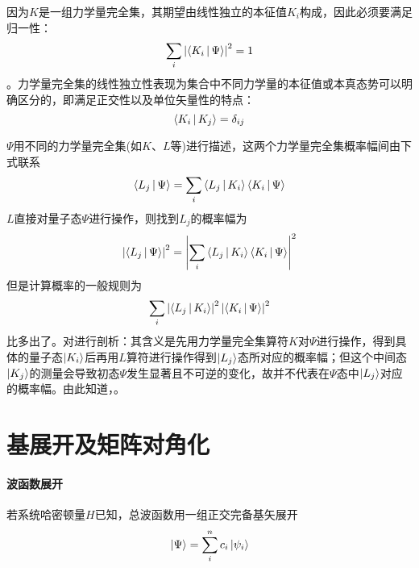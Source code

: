 因为$K$是一组力学量完全集，其期望由线性独立的本征值$K_i$构成，因此必须要满足归一性：
\begin{equation}
    \sum_{i} \left|\Braket{K_i | \Psi}\right|^2 = 1
\end{equation}
。力学量完全集的线性独立性表现为集合中不同力学量的本征值或本真态势可以明确区分的，即满足正交性以及单位矢量性的特点：
\begin{equation}
    \Braket{K_i | K_j} = \delta_{ij}
\end{equation}

$\Psi$用不同的力学量完全集(如$K$、$L$等)进行描述，这两个力学量完全集概率幅间由下式联系
\begin{equation}
    \Braket{L_j | \Psi} = \sum_{i}\Braket{L_j | K_i}\Braket{K_i | \Psi}
\end{equation}
$L$直接对量子态$\Psi$进行操作，则找到$L_j$的概率幅为
\begin{equation}
    \left| \Braket{L_j | \Psi} \right|^2 = \left| \sum_{i}\Braket{L_j | K_i}\Braket{K_i | \Psi} \right|^2
    \label{eq:lj-in-psi}
\end{equation}
但是计算概率的一般规则为
\begin{equation}
    \sum_{i} \left|\Braket{L_j | K_i}\right|^2 \left| \Braket{K_i | \Psi} \right|^2
    \label{eq:conv-cal-prob}
\end{equation}
比多出了。对进行剖析：其含义是先用力学量完全集算符$K$对$\Psi$进行操作，得到具体的量子态$\ket{K_i}$后再用$L$算符进行操作得到$\ket{L_j}$态所对应的概率幅；但这个中间态$\ket{K_j}$的测量会导致初态$\Psi$发生显著且不可逆的变化，故并不代表在$\Psi$态中$\ket{L_j}$对应的概率幅。由此知道，。

\section{基展开及矩阵对角化} \label{sec:mat-diag}
\paragraph*{波函数展开}
若系统哈密顿量$H$已知，总波函数用一组正交完备基矢展开
\begin{equation}
    \ket{\Psi} = \sum_{i}^{n} c_i \ket{\psi_i}
    \label{eq:wv-expand-basis}
\end{equation}

